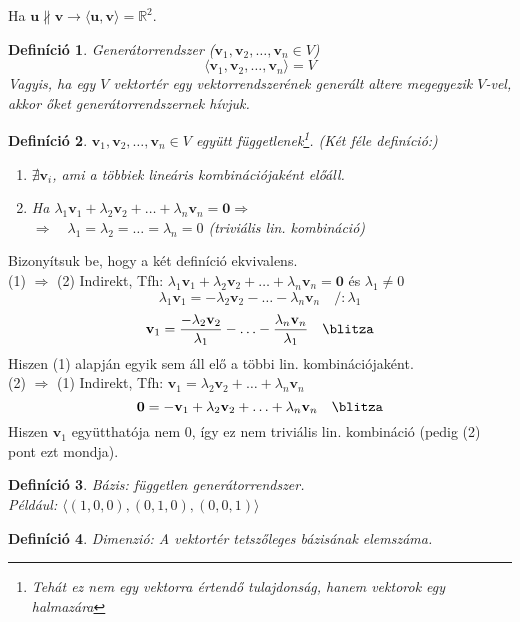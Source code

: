 \documentclass[a4paper,12pt,twoside]{book}
\newcommand{\vek}[1]{\mathbf{#1}} %
\newcommand{\lista}[2]{{#1}_{1}, {#1}_{2}, \ldots, {#1}_{#2}}
\newcommand{\gen}[1]{\langle #1 \rangle}
\newcommand{\linkomb}[3]{#2_1\vek{#1}_{1} + #2_2\vek{#1}_{2} + \ldots + #2_{#3}\vek{#1}_{#3}}
\newcommand{\R}{\mathbb{R}}
\newtheorem{defi}{Definíció}[chapter]
\theoremstyle{break}
\begin{document}
Ha $\vek{u}\nparallel\vek{v} \rightarrow \gen{\vek{u},\vek{v}}=\R^2$.

\begin{defi} \textit{Generátorrendszer} ($\lista{\vek{v}}{n} \in V$)
\[\gen{\lista{\vek{v}}{n}}=V\]
Vagyis, ha egy $V$ vektortér egy vektorrendszerének generált altere megegyezik $V$-vel, akkor őket generátorrendszernek hívjuk.
\end{defi}

\begin{defi} $\lista{\vek{v}}{n}\in V$ együtt függetlenek\footnote{Tehát ez nem egy vektorra értendő tulajdonság, hanem vektorok egy halmazára}. (Két féle definíció:)
\begin{enumerate}
\item $\nexists \vek{v}_i$, ami a többiek lineáris kombinációjaként előáll.
\item Ha $\linkomb{v}{\lambda}{n}=\vek{0} \Rightarrow $\\
$\Rightarrow\quad \lambda_1=\lambda_2=\ldots=\lambda_n=0$ (triviális lin. kombináció)
\end{enumerate}
\end{defi}

Bizonyítsuk be, hogy a két definíció ekvivalens.\\
(1) $\Rightarrow$ (2)
Indirekt, Tfh: $\linkomb{v}{\lambda}{n}=\vek{0}$ és $\lambda_1 \neq 0$
\[\lambda_1\vek{v}_1=-\lambda_2\vek{v}_2-\ldots-\lambda_n\vek{v}_n \quad /:\lambda_1\]
\[\vek{v}_1=\frac{-\lambda_2\vek{v}_2}{\lambda_1}-\ldots-\frac{\lambda_n\vek{v}_n}{\lambda_1} \quad \hbox{\blitza}\]
Hiszen (1) alapján egyik sem áll elő a többi lin. kombinációjaként.\\
(2) $\Rightarrow$ (1)
Indirekt, Tfh: $\vek{v}_1 = \lambda_2\vek{v}_2+\ldots+\lambda_n\vek{v}_n$
\[\vek{0}=-\vek{v}_1+\lambda_2\vek{v}_2+\ldots+\lambda_n\vek{v}_n \quad \hbox{\blitza}\]
Hiszen $\vek{v}_1$ együtthatója nem 0, így ez nem triviális lin. kombináció (pedig (2) pont ezt mondja).

\begin{defi} \textit{Bázis}: független generátorrendszer.\\
Például: $\gen{(1,0,0),(0,1,0),(0,0,1)}$
\end{defi}
\begin{defi} \textit{Dimenzió}: A vektortér tetszőleges bázisának elemszáma.\end{defi}
\end{document}
